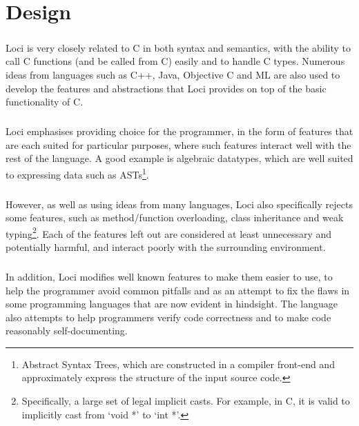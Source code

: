 \documentclass[12pt,twoside,notitlepage]{report}
\begin{document}
\cleardoublepage

\chapter{Design}

\paragraph{}
Loci is very closely related to C in both syntax and semantics, with the ability to call C functions (and be called from C) easily and to handle C types. Numerous ideas from languages such as C++, Java, Objective C and ML are also used to develop the features and abstractions that Loci provides on top of the basic functionality of C.

\paragraph{}
Loci emphasises providing choice for the programmer, in the form of features that are each suited for particular purposes, where such features interact well with the rest of the language. A good example is algebraic datatypes, which are well suited to expressing data such as ASTs\footnote{Abstract Syntax Trees, which are constructed in a compiler front-end and approximately express the structure of the input source code.}.

\paragraph{}
However, as well as using ideas from many languages, Loci also specifically rejects some features, such as method/function overloading, class inheritance and weak typing\footnote{Specifically, a large set of legal implicit casts. For example, in C, it is valid to implicitly cast from `void *' to `int *'.}. Each of the features left out are considered at least unnecessary and potentially harmful, and interact poorly with the surrounding environment.

\paragraph{}
In addition, Loci modifies well known features to make them easier to use, to help the programmer avoid common pitfalls and as an attempt to fix the flaws in some programming languages that are now evident in hindsight. The language also attempts to help programmers verify code correctness and to make code reasonably self-documenting.
\end{document}
